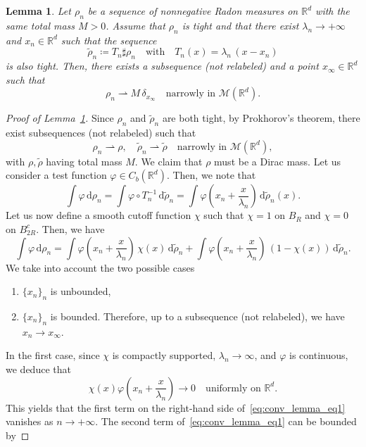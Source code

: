 \documentclass[11pt,a4paper]{article}
\numberwithin{equation}{section}
\newcommand{\R}{{\mathbb{R}}}
\theoremstyle{plain}
\newtheorem{lemma}[theorem]{Lemma}
\theoremstyle{remark}
\newcommand {\f}{\frac}
\begin{document}
\begin{lemma}\label{lem:contradiction_ Dirac_mass}
Let $\rho_n$ be a sequence of nonnegative Radon measures on $\mathbb{R}^d$ with the same total mass $M>0$. Assume that $\rho_n$ is tight and that there exist $\lambda_n\to+\infty$ and $x_n\in\R^d$ such that the sequence
\[
\tilde{\rho}_n  \coloneqq  T_n\sharp\rho_n
\quad \text{with} \quad
T_n(x)=\lambda_n\,(x - x_n)
\]
is also tight. Then, there exists a subsequence (not relabeled) and a point $x_\infty\in\R^d$ such that
\[
\rho_n  \rightharpoonup  M\,\delta_{x_\infty}
\quad
\text{narrowly in $\mathcal{M}(\R^d)$}.
\]
\end{lemma}

\begin{proof}[Proof of Lemma~\ref{lem:contradiction_ Dirac_mass}]
Since $\rho_n$ and $\tilde{\rho}_n$ are both tight, by Prokhorov’s theorem, there exist subsequences (not relabeled) such that
\[
\rho_n  \rightharpoonup \rho, 
\quad
\tilde{\rho}_n  \rightharpoonup \tilde{\rho}
\quad
\text{narrowly in } \mathcal{M}(\R^d),
\]
with $\rho,\tilde{\rho}$ having total mass $M$. We claim that $\rho$ must be a  Dirac mass. 
Let us consider a test function $\varphi\in C_b(\R^d)$. Then,  we note that
\[
\int \varphi\,\mathrm{d}\rho_n
  = 
\int \varphi\circ T_n^{-1}\,\mathrm{d}\tilde{\rho}_n
  = 
\int \varphi\!\left(x_n + \f{x}{\lambda_n}\right)\,\mathrm{d}\tilde{\rho}_n(x).
\]
Let us now define a smooth cutoff function $\chi$ such that $\chi=1$ on $B_R$ and $\chi=0$ on $B_{2R}^c$. Then, we have 
\begin{equation}\label{eq:conv_lemma_eq1}
\int \varphi\,\mathrm{d}\rho_n
  = 
\int \varphi\!\left(x_n + \f{x}{\lambda_n}\right)\,\chi(x)\,\mathrm{d}\tilde{\rho}_n
 + 
\int \varphi\!\left(x_n + \f{x}{\lambda_n}\right)\,\left(1-\chi(x)\right)\,\mathrm{d}\tilde{\rho}_n.
\end{equation}
We take into account the two possible cases
\begin{enumerate}
    \item $\{x_n\}_n$ is unbounded,
    \item $\{x_n\}_n$ is bounded. Therefore, up to a subsequence (not relabeled), we have $x_n\to x_{\infty}$.
\end{enumerate}
In the first case, since $\chi$ is compactly supported, $\lambda_n\to \infty$, and $\varphi$ is continuous, we deduce that
$$
\chi(x)\varphi\left(x_n + \f{x}{\lambda_n}\right) \to 0 \quad \text{uniformly on $\R^d$}.
$$
This yields that the first term on the right-hand side of~\eqref{eq:conv_lemma_eq1} vanishes as $n\to+\infty$. The second term of~\eqref{eq:conv_lemma_eq1} can be bounded by 

\end{proof}
\end{document}
